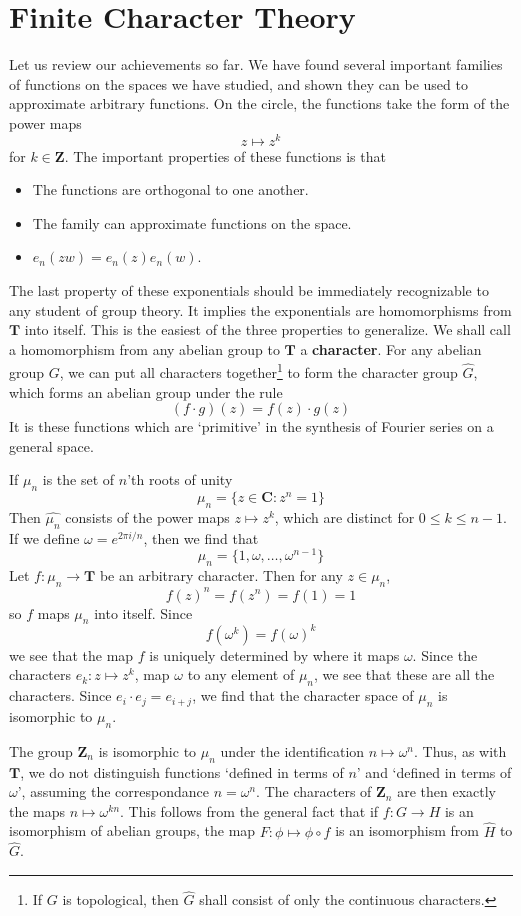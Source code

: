 \chapter{Finite Character Theory}

Let us review our achievements so far. We have found several important families of functions on the spaces we have studied, and shown they can be used to approximate arbitrary functions. On the circle, the functions take the form of the power maps
%
\[ z \mapsto z^k \]
%
for $k \in \mathbf{Z}$. The important properties of these functions is that
%
\begin{itemize}
    \item The functions are orthogonal to one another.
    \item The family can approximate functions on the space.
    \item $e_n(zw) = e_n(z) e_n(w)$.
\end{itemize}
%
The last property of these exponentials should be immediately recognizable to any student of group theory. It implies the exponentials are homomorphisms from $\mathbf{T}$ into itself. This is the easiest of the three properties to generalize. We shall call a homomorphism from any abelian group to $\mathbf{T}$ a {\bf character}. For any abelian group $G$, we can put all characters together\footnote{If $G$ is topological, then $\hat{G}$ shall consist of only the continuous characters.} to form the character group $\hat{G}$, which forms an abelian group under the rule
%
\[ (f \cdot g)(z) = f(z) \cdot g(z) \]
%
It is these functions which are `primitive' in the synthesis of Fourier series on a general space.

\begin{example}
    If $\mu_n$ is the set of $n$'th roots of unity
    \[ \mu_n = \{ z \in \mathbf{C} : z^n = 1 \} \]
    Then $\hat{\mu_n}$ consists of the power maps $z \mapsto z^k$, which are distinct for $0 \leq k \leq n-1$. If we define $\omega = e^{2 \pi i/n}$, then we find that
    \[ \mu_n = \{ 1, \omega, \dots, \omega^{n-1} \} \]
    Let $f: \mu_n \to \mathbf{T}$ be an arbitrary character. Then for any $z \in \mu_n$,
    \[ f(z)^n = f(z^n) = f(1) = 1 \]
    so $f$ maps $\mu_n$ into itself. Since
    \[ f(\omega^k) = f(\omega)^k \]
    we see that the map $f$ is uniquely determined by where it maps $\omega$. Since the characters $e_k: z \mapsto z^k$, map $\omega$ to any element of $\mu_n$, we see that these are all the characters. Since $e_i \cdot e_j = e_{i+j}$, we find that the character space of $\mu_n$ is isomorphic to $\mu_n$.

    The group $\mathbf{Z}_n$ is isomorphic to $\mu_n$ under the identification $n \mapsto \omega^n$. Thus, as with $\mathbf{T}$, we do not distinguish functions `defined in terms of $n$' and `defined in terms of $\omega$', assuming the correspondance $n = \omega^n$. The characters of $\mathbf{Z}_n$ are then exactly the maps $n \mapsto \omega^{kn}$. This follows from the general fact that if $f: G \to H$ is an isomorphism of abelian groups, the map $F: \phi \mapsto \phi \circ f$ is an isomorphism from $\hat{H}$ to $\hat{G}$.
\end{example}

